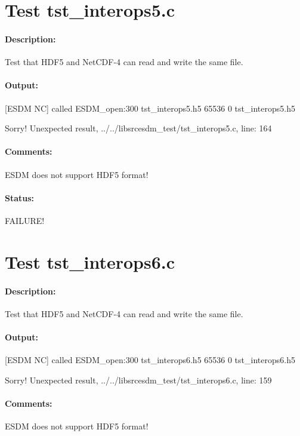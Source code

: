 \section{Test tst\_interops5.c}

\paragraph{Description:} Test that HDF5 and NetCDF-4 can read and write the same file.

\paragraph{Output:} [ESDM NC] called ESDM\_open:300 tst\_interops5.h5 65536 0 tst\_interops5.h5

Sorry! Unexpected result, ../../libsrcesdm\_test/tst\_interops5.c, line: 164

\paragraph{Comments:} ESDM does not support HDF5 format!

\paragraph{Status:} FAILURE!

\section{Test tst\_interops6.c}

\paragraph{Description:} Test that HDF5 and NetCDF-4 can read and write the same file.

\paragraph{Output:} [ESDM NC] called ESDM\_open:300 tst\_interops6.h5 65536 0 tst\_interops6.h5

Sorry! Unexpected result, ../../libsrcesdm\_test/tst\_interops6.c, line: 159

\paragraph{Comments:} ESDM does not support HDF5 format!

